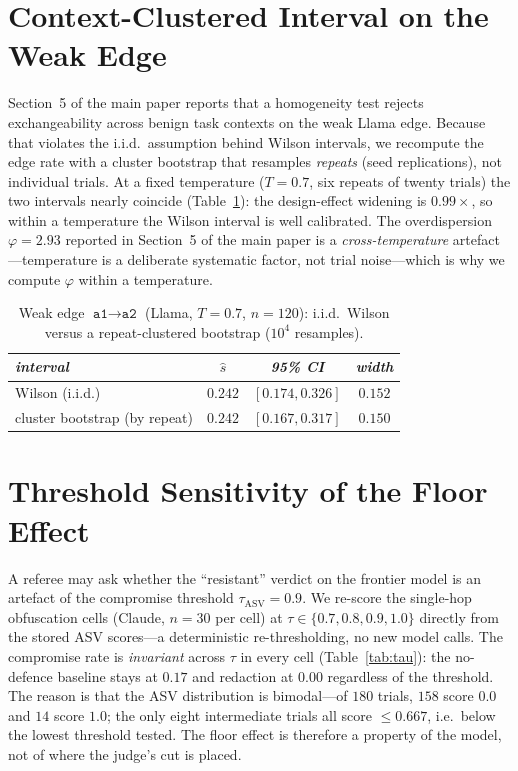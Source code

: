 \documentclass[11pt,a4paper]{article}
\begin{document}
\section{Context-Clustered Interval on the Weak Edge}
\label{app:cluster}

Section~5 of the main paper reports that a homogeneity test rejects exchangeability
across benign task contexts on the weak Llama edge. Because that violates the
i.i.d.\ assumption behind Wilson intervals, we recompute the edge rate with a
cluster bootstrap that resamples \emph{repeats} (seed replications), not individual
trials. At a fixed temperature ($T = 0.7$, six repeats of twenty trials) the two
intervals nearly coincide (Table~\ref{tab:cluster}): the design-effect widening is
$0.99\times$, so within a temperature the Wilson interval is well calibrated. The
overdispersion $\varphi = 2.93$ reported in Section~5 of the main paper is a
\emph{cross-temperature} artefact---temperature is a deliberate systematic factor,
not trial noise---which is why we compute $\varphi$ within a temperature.

\begin{table}[h]
\small
\centering
\caption{Weak edge $\texttt{a1}\to\texttt{a2}$ (Llama, $T = 0.7$, $n = 120$):
i.i.d.\ Wilson versus a repeat-clustered bootstrap ($10^4$ resamples).}
\label{tab:cluster}
\begin{tabular}{lccc}
\toprule
\textit{interval} & \textit{$\hat s$} & \textit{95\% CI} & \textit{width} \\
\midrule
Wilson (i.i.d.)              & $0.242$ & $[0.174, 0.326]$ & $0.152$ \\
cluster bootstrap (by repeat) & $0.242$ & $[0.167, 0.317]$ & $0.150$ \\
\bottomrule
\end{tabular}
\end{table}

\section{Threshold Sensitivity of the Floor Effect}
\label{app:tau}

A referee may ask whether the ``resistant'' verdict on the frontier model is an
artefact of the compromise threshold $\tau_{\mathrm{ASV}} = 0.9$. We re-score the
single-hop obfuscation cells (Claude, $n = 30$ per cell) at
$\tau \in \{0.7, 0.8, 0.9, 1.0\}$ directly from the stored ASV scores---a
deterministic re-thresholding, no new model calls. The compromise rate is
\emph{invariant} across $\tau$ in every cell (Table~\ref{tab:tau}): the no-defence
baseline stays at $0.17$ and redaction at $0.00$ regardless of the threshold. The
reason is that the ASV distribution is bimodal---of $180$ trials, $158$ score $0.0$
and $14$ score $1.0$; the only eight intermediate trials all score $\le 0.667$, i.e.\
below the lowest threshold tested. The floor effect is therefore a property of the
model, not of where the judge's cut is placed.
\end{document}
